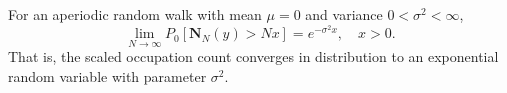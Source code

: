 For an aperiodic random walk with mean $\mu = 0$ and variance $0 < \sigma^2 < \infty$,
$$\lim_{N \to \infty} P_0\left[ \mathbf{N}_N(y) > N x \right] = e^{-\sigma^2 x}, \quad x > 0.$$
That is, the scaled occupation count converges in distribution to an exponential random variable with parameter $\sigma^2$.
